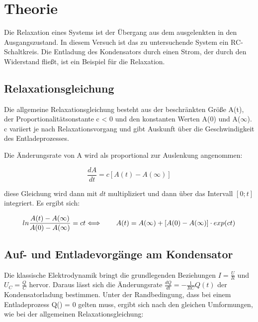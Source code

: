 \section{Theorie}
\label{sec:Theorie}

Die Relaxation eines Systems ist der Übergang aus dem ausgelenkten in den Ausgangszustand.
In diesem Versuch ist das zu untersuchende System ein RC-Schaltkreis.
Die Entladung des Kondensators durch einen Strom, der durch den Widerstand fließt, 
ist ein Beispiel für die Relaxation.

\subsection{Relaxationsgleichung}
\label{subsec:Die Relaxationsgleichung}

Die allgemeine Relaxationsgleichung besteht aus der beschränkten Größe A(t), der Proportionalitätsonstante c < 0 
und den konstanten
Werten A(0) und A($\infty$).
c variiert je nach Relaxationsvorgang und gibt Auskunft über die Geschwindigkeit des Entladeprozesses.

Die Änderungsrate von A wird als proportional zur Auslenkung angenommen:

\begin{equation} \label{eq:Relaxation}

\frac{dA}{dt} = c[A(t)-A(\infty)]
    
\end{equation}

diese Gleichung wird dann mit $dt$ multipliziert und dann über das Intervall $[0; t]$ integriert. 
Es ergibt sich:

\begin{equation}
    
ln\frac{A(t)-A(\infty)}{A(0)-A(\infty)} = ct \\

\Longleftrightarrow\qquad A(t) = A(\infty) + [A(0)-A(\infty)] \cdot exp(ct)

\end{equation}


\subsection{Auf- und Entladevorgänge am Kondensator}
\label{subsec:Entladevorgänge am Kondensator}

Die klassische Elektrodynamik bringt die grundlegenden Beziehungen $I = \frac{U}{R}$ und $U_C = \frac{Q}{C}$ 
hervor.
Daraus lässt sich die Änderungsrate $\frac{dQ}{dt} = -\frac{1}{RC}Q(t)$ der Kondensatorladung bestimmen. 
Unter der Randbedingung, dass bei einem Entladeprozess Q(\infty) = 0 gelten muss, ergibt sich nach den gleichen
Umformungen, wie bei der allgemeinen Relaxationsgleichung:

